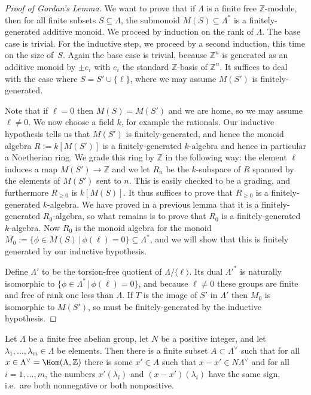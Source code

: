 \begin{proof}[Proof of Gordan's Lemma]
  We want to prove that if $\Lambda$ is a finite free $\mathbb{Z}$-module, then for all finite subsets $S\subseteq\Lambda$, the submonoid $M(S)\subseteq\Lambda^*$ is a finitely-generated additive monoid. We proceed by induction on the rank of $\Lambda$. The base case is trivial. For the inductive step, we proceed by a second induction, this time on the size of~$S$. Again the base case is trivial, because $\mathbb{Z}^n$ is generated as an additive monoid by $\pm e_i$ with $e_i$ the standard $\mathbb{Z}$-basis of $\mathbb{Z}^n$. It suffices to deal with the case where $S=S'\cup\{\ell\}$, where we may assume $M(S')$ is finitely-generated.

Note that if $\ell=0$ then $M(S)=M(S')$ and we are home, so we may assume $\ell\not=0$. We now choose a field $k$, for example the rationals. Our inductive hypothesis tells us that $M(S')$ is finitely-generated, and hence the monoid algebra $R:=k[M(S')]$ is a finitely-generated $k$-algebra and hence in particular a Noetherian ring. We grade this ring by $\mathbb{Z}$ in the following way: the element $\ell$ induces a map $M(S')\to\mathbb{Z}$ and we let $R_n$ be the $k$-subspace of $R$ spanned by the elements of $M(S')$ sent to $n$. This is easily checked to be a grading, and furthermore $R_{\geq0}$ is $k[M(S)]$. It thus suffices to prove that $R_{\geq0}$ is a finitely-generated $k$-algebra. We have proved in a previous lemma that it is a finitely-generated $R_0$-algebra, so what remains is to prove that $R_0$ is a finitely-generated $k$-algebra. Now $R_0$ is the monoid algebra for the monoid $M_0:=\{\phi\in M(S)\,|\,\phi(\ell)=0\}\subseteq\Lambda^*$, and we will show that this is finitely generated by our inductive hypothesis.

Define $\Lambda'$ to be the torsion-free quotient of $\Lambda/\langle \ell\rangle$. Its dual $\Lambda'^*$ is naturally isomorphic to $\{\phi\in\Lambda^*\,|\,\phi(\ell)=0\}$, and because $\ell\not=0$ these groups are finite and free of rank one less than $\Lambda$. If $T$ is the image of $S'$ in $\Lambda'$ then $M_0$ is isomorphic to $M(S')$, so must be finitely-generated by the inductive hypothesis. 

  
\end{proof}


\begin{lemma}
  \label{combi_aux}
  \leanok
  Let $\Lambda$ be a finite free abelian group,
  let $N$ be a positive integer,
  and let $\lambda_1,\ldots,\lambda_m\in \Lambda$ be elements.
  Then there is a finite subset $A\subset \Lambda^\vee$
  such that for all $x\in \Lambda^\vee=\Hom(\Lambda,\mathbb Z)$
  there is some $x'\in A$ such that $x-x'\in N\Lambda^\vee$
  and for all $i=1,\ldots,m$,
  the numbers $x'(\lambda_i)$ and $(x-x')(\lambda_i)$ have the same sign,
  i.e.~are both nonnegative or both nonpositive.
\end{lemma}


